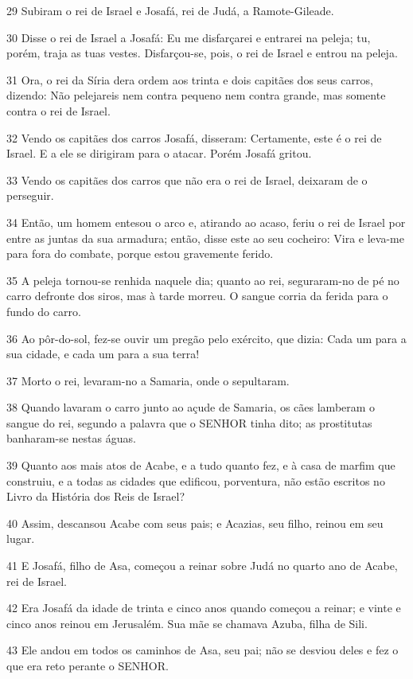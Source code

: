 \par 29 Subiram o rei de Israel e Josafá, rei de Judá, a Ramote-Gileade.
\par 30 Disse o rei de Israel a Josafá: Eu me disfarçarei e entrarei na peleja; tu, porém, traja as tuas vestes. Disfarçou-se, pois, o rei de Israel e entrou na peleja.
\par 31 Ora, o rei da Síria dera ordem aos trinta e dois capitães dos seus carros, dizendo: Não pelejareis nem contra pequeno nem contra grande, mas somente contra o rei de Israel.
\par 32 Vendo os capitães dos carros Josafá, disseram: Certamente, este é o rei de Israel. E a ele se dirigiram para o atacar. Porém Josafá gritou.
\par 33 Vendo os capitães dos carros que não era o rei de Israel, deixaram de o perseguir.
\par 34 Então, um homem entesou o arco e, atirando ao acaso, feriu o rei de Israel por entre as juntas da sua armadura; então, disse este ao seu cocheiro: Vira e leva-me para fora do combate, porque estou gravemente ferido.
\par 35 A peleja tornou-se renhida naquele dia; quanto ao rei, seguraram-no de pé no carro defronte dos siros, mas à tarde morreu. O sangue corria da ferida para o fundo do carro.
\par 36 Ao pôr-do-sol, fez-se ouvir um pregão pelo exército, que dizia: Cada um para a sua cidade, e cada um para a sua terra!
\par 37 Morto o rei, levaram-no a Samaria, onde o sepultaram.
\par 38 Quando lavaram o carro junto ao açude de Samaria, os cães lamberam o sangue do rei, segundo a palavra que o SENHOR tinha dito; as prostitutas banharam-se nestas águas.
\par 39 Quanto aos mais atos de Acabe, e a tudo quanto fez, e à casa de marfim que construiu, e a todas as cidades que edificou, porventura, não estão escritos no Livro da História dos Reis de Israel?
\par 40 Assim, descansou Acabe com seus pais; e Acazias, seu filho, reinou em seu lugar.
\par 41 E Josafá, filho de Asa, começou a reinar sobre Judá no quarto ano de Acabe, rei de Israel.
\par 42 Era Josafá da idade de trinta e cinco anos quando começou a reinar; e vinte e cinco anos reinou em Jerusalém. Sua mãe se chamava Azuba, filha de Sili.
\par 43 Ele andou em todos os caminhos de Asa, seu pai; não se desviou deles e fez o que era reto perante o SENHOR.
